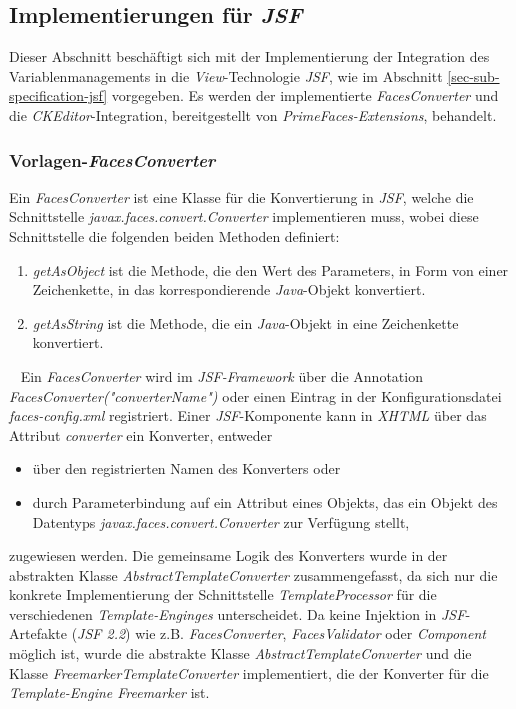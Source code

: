 \subsection{Implementierungen für \emph{JSF}}
\label{sec:sub-impl-integartion-jsf}
Dieser Abschnitt beschäftigt sich mit der Implementierung der Integration des Variablenmanagements in die \emph{View}-Technologie \emph{JSF}, wie im Abschnitt \ref{sec-sub-specification-jsf} vorgegeben. Es werden der implementierte \emph{FacesConverter} und die \emph{CKEditor}-Integration, bereitgestellt von \emph{PrimeFaces-Extensions}, behandelt.

\subsubsection{Vorlagen-\emph{FacesConverter}}
Ein \emph{FacesConverter} ist eine Klasse für die Konvertierung in \emph{JSF}, welche die Schnittstelle \emph{javax.faces.convert.Converter} implementieren muss, wobei diese Schnittstelle die folgenden beiden Methoden definiert:
\begin{enumerate}
	\item\emph{getAsObject} ist die Methode, die den Wert des Parameters, in Form von einer Zeichenkette, in das korrespondierende \emph{Java}-Objekt konvertiert.
	\item\emph{getAsString} ist die Methode, die ein \emph{Java}-Objekt in eine Zeichenkette konvertiert.
\end{enumerate}
\ \newline
Ein \emph{FacesConverter} wird im \emph{JSF-Framework} über die Annotation \emph{FacesConverter("converterName")} oder einen Eintrag in der  Konfigurationsdatei \emph{faces-config.xml} registriert. Einer \emph{JSF}-Komponente kann in \emph{XHTML} über das Attribut \emph{converter} ein Konverter, entweder 
\begin{itemize}
	\item über den registrierten Namen des Konverters oder 
	\item durch Parameterbindung auf ein Attribut eines Objekts, das ein Objekt des Datentyps \emph{javax.faces.convert.Converter} zur Verfügung stellt,
\end{itemize}
zugewiesen werden. 
\newline
\newline
Die gemeinsame Logik des Konverters wurde in der abstrakten Klasse \emph{AbstractTemplateConverter} zusammengefasst, da sich nur die konkrete Implementierung der Schnittstelle \emph{TemplateProcessor} für die verschiedenen \emph{Template-Enginges} unterscheidet. Da keine Injektion in \emph{JSF}-Artefakte (\emph{JSF 2.2}) wie z.B. \emph{FacesConverter}, \emph{FacesValidator} oder \emph{Component} möglich ist, wurde die abstrakte Klasse \emph{AbstractTemplateConverter} und die Klasse \emph{FreemarkerTemplateConverter} implementiert, die der Konverter für die \emph{Template-Engine Freemarker} ist. 
